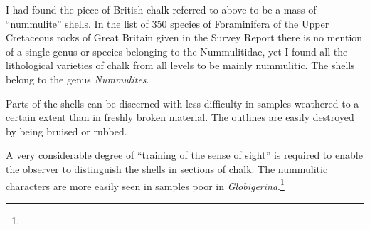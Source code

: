 \documentclass[a4paper, 12pt, oneside]{article}
\begin{document}
I had found the piece of British chalk referred to above to be a mass of ``nummulite'' shells. In the list of 350 species of Foraminifera of the Upper Cretaceous rocks of Great Britain given in the Survey Report there is no mention of a single genus or species belonging to the Nummulitidae, yet I found all the lithological varieties of chalk from all levels to be mainly nummulitic. The shells belong to the genus \emph{Nummulites}.

Parts of the shells can be discerned with less difficulty in samples weathered to a certain extent than in freshly broken material. The outlines are easily destroyed by being bruised or rubbed.

A very considerable degree of ``training of the sense of sight'' is required to enable the observer to distinguish the shells in sections of chalk. The nummulitic characters are more easily seen in samples poor in \emph{Globigerina}.\footnote{}
\end{document}
